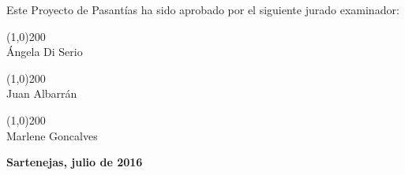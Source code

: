 \begin{titlepage}
\begin{center}
\begin{minipage}{\textwidth}
            \bigskip
            \bigskip
            \bigskip
            \bigskip
            
            Este Proyecto de Pasantías ha sido aprobado por el siguiente jurado examinador: \\
            
            \bigskip
            \bigskip
            
            \line(1,0){200} \\
            Ángela Di Serio\\
            
            \bigskip
            \bigskip
            
            \line(1,0){200} \\
            Juan Albarrán\\
            
            \bigskip
            \bigskip
            
            \line(1,0){200} \\
            Marlene Goncalves \\
        \end{minipage}
        
        \bigskip
        \bigskip
        \vfill
        
        {\large \bfseries Sartenejas, julio de 2016}
        
    \end{center}
\end{titlepage}

\pagebreak
